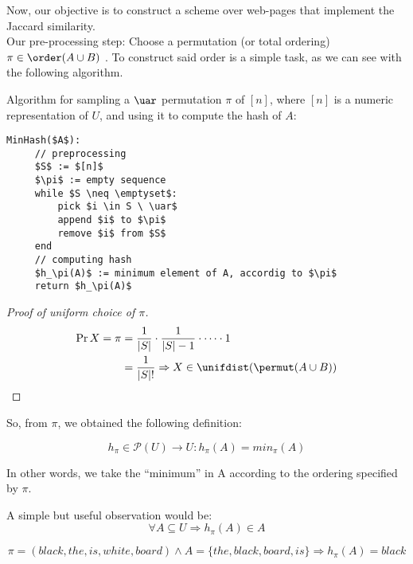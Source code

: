 	Now, our objective is to construct a scheme over web-pages that implement the Jaccard similarity.\\
	Our pre-processing step: Choose a permutation (or total ordering) $\pi \in \order(A \cup B)$ \uar. To construct said order is a simple task, as we can see with the following algorithm.
	
	Algorithm for sampling a $\uar$ permutation $\pi$ of $[n]$, where $[n]$ is a numeric representation of $U$, and using it to compute the hash of $A$:
	\begin{lstlisting}[caption={min hash or shingles algorithm},label={lst:min_hash}]
MinHash($A$):
     // preprocessing
     $S$ := $[n]$
     $\pi$ := empty sequence
     while $S \neq \emptyset$:
         pick $i \in S \ \uar$
         append $i$ to $\pi$
         remove $i$ from $S$
     end
     // computing hash
     $h_\pi(A)$ := minimum element of A, accordig to $\pi$
     return $h_\pi(A)$
	\end{lstlisting}
	
    \begin{proof}[Proof of uniform choice of $\pi$]
        \begin{align*}
        \Pr{X = \pi} &= \frac{1}{|S|}\cdot\frac{1}{|S|-1}\cdot\dots\cdot 1\\
        &= \frac{1}{|S|!} \Rightarrow X \in \unifdist(\permut(A \cup B))
        \end{align*}
    \end{proof}
	
	So, from $\pi$, we obtained the following definition:
    \begin{defn}
        \begin{equation}
        h_\pi \in \mathcal{P}(U) \to U : h_\pi(A) = min_\pi(A)
        \end{equation}
    \end{defn}
	
	In other words, we take the ``minimum'' in A according to the ordering specified by $\pi$.
    
    \begin{obs}
        A simple but useful observation would be:
        \begin{equation}
        \forall A \subseteq U \Rightarrow h_\pi(A) \in A
        \end{equation}
    \end{obs}
	
	\begin{ex}
       	\begin{equation*}
            \pi = (black, the, is, white, board) \wedge A = \{the, black, board, is\} \Rightarrow h_\pi(A) = black
        \end{equation*}
    \end{ex}
	
